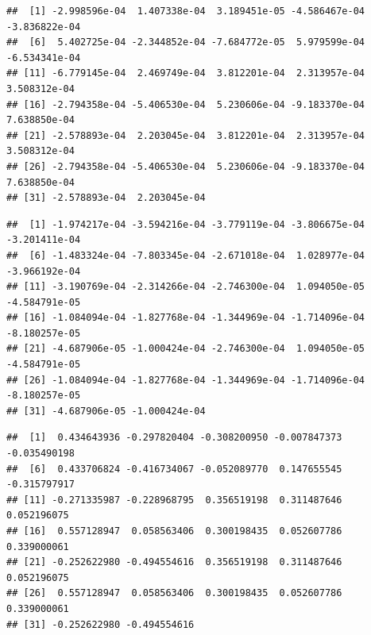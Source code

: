 \documentclass[
]{krantz}
\makeatletter
\newenvironment{Shaded}{\begin{snugshade}}{\end{snugshade}}
\newcommand{\NormalTok}[1]{#1}
\newcommand{\SpecialCharTok}[1]{\textcolor[rgb]{0.00,0.00,0.00}{#1}}
\newenvironment{kframe}{%
\medskip{}
\setlength{\fboxsep}{.8em}
 \def\at@end@of@kframe{}%
 \ifinner\ifhmode%
  \def\at@end@of@kframe{\end{minipage}}%
  \begin{minipage}{\columnwidth}%
 \fi\fi%
 \def\FrameCommand##1{\hskip\@totalleftmargin \hskip-\fboxsep
 \colorbox{shadecolor}{##1}\hskip-\fboxsep
     \hskip-\linewidth \hskip-\@totalleftmargin \hskip\columnwidth}%
 \MakeFramed {\advance\hsize-\width
   \@totalleftmargin\z@ \linewidth\hsize
   \@setminipage}}%
 {\par\unskip\endMakeFramed%
 \at@end@of@kframe}
\renewenvironment{Shaded}{\begin{kframe}}{\end{kframe}}
\makeatother
\begin{document}
\begin{verbatim}
##  [1] -2.998596e-04  1.407338e-04  3.189451e-05 -4.586467e-04 -3.836822e-04
##  [6]  5.402725e-04 -2.344852e-04 -7.684772e-05  5.979599e-04 -6.534341e-04
## [11] -6.779145e-04  2.469749e-04  3.812201e-04  2.313957e-04  3.508312e-04
## [16] -2.794358e-04 -5.406530e-04  5.230606e-04 -9.183370e-04  7.638850e-04
## [21] -2.578893e-04  2.203045e-04  3.812201e-04  2.313957e-04  3.508312e-04
## [26] -2.794358e-04 -5.406530e-04  5.230606e-04 -9.183370e-04  7.638850e-04
## [31] -2.578893e-04  2.203045e-04
\end{verbatim}

\begin{Shaded}
\end{Shaded}

\begin{verbatim}
##  [1] -1.974217e-04 -3.594216e-04 -3.779119e-04 -3.806675e-04 -3.201411e-04
##  [6] -1.483324e-04 -7.803345e-04 -2.671018e-04  1.028977e-04 -3.966192e-04
## [11] -3.190769e-04 -2.314266e-04 -2.746300e-04  1.094050e-05 -4.584791e-05
## [16] -1.084094e-04 -1.827768e-04 -1.344969e-04 -1.714096e-04 -8.180257e-05
## [21] -4.687906e-05 -1.000424e-04 -2.746300e-04  1.094050e-05 -4.584791e-05
## [26] -1.084094e-04 -1.827768e-04 -1.344969e-04 -1.714096e-04 -8.180257e-05
## [31] -4.687906e-05 -1.000424e-04
\end{verbatim}

\begin{Shaded}
\end{Shaded}

\begin{verbatim}
##  [1]  0.434643936 -0.297820404 -0.308200950 -0.007847373 -0.035490198
##  [6]  0.433706824 -0.416734067 -0.052089770  0.147655545 -0.315797917
## [11] -0.271335987 -0.228968795  0.356519198  0.311487646  0.052196075
## [16]  0.557128947  0.058563406  0.300198435  0.052607786  0.339000061
## [21] -0.252622980 -0.494554616  0.356519198  0.311487646  0.052196075
## [26]  0.557128947  0.058563406  0.300198435  0.052607786  0.339000061
## [31] -0.252622980 -0.494554616
\end{verbatim}
\end{document}

